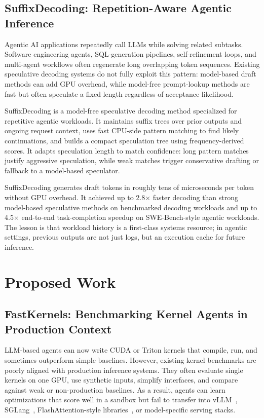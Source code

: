 \documentclass[11pt]{article}
\newcommand{\SuffixDecoding}{SuffixDecoding}
\newcommand{\FastKernels}{FastKernels}
\begin{document}
\subsection{\SuffixDecoding: Repetition-Aware Agentic Inference}

Agentic AI applications repeatedly call LLMs while solving related subtasks. Software engineering agents, SQL-generation pipelines, self-refinement loops, and multi-agent workflows often regenerate long overlapping token sequences. Existing speculative decoding systems do not fully exploit this pattern: model-based draft methods can add GPU overhead, while model-free prompt-lookup methods are fast but often speculate a fixed length regardless of acceptance likelihood.

\SuffixDecoding{} is a model-free speculative decoding method specialized for repetitive agentic workloads. It maintains suffix trees over prior outputs and ongoing request context, uses fast CPU-side pattern matching to find likely continuations, and builds a compact speculation tree using frequency-derived scores. It adapts speculation length to match confidence: long pattern matches justify aggressive speculation, while weak matches trigger conservative drafting or fallback to a model-based speculator.

\SuffixDecoding{} generates draft tokens in roughly tens of microseconds per token without GPU overhead. It achieved up to 2.8$\times$ faster decoding than strong model-based speculative methods on benchmarked decoding workloads and up to 4.5$\times$ end-to-end task-completion speedup on SWE-Bench-style agentic workloads. The lesson is that workload history is a first-class systems resource; in agentic settings, previous outputs are not just logs, but an execution cache for future inference.

\section{Proposed Work}

\subsection{\FastKernels: Benchmarking Kernel Agents in Production Context}

LLM-based agents can now write CUDA or Triton kernels that compile, run, and sometimes outperform simple baselines. However, existing kernel benchmarks are poorly aligned with production inference systems. They often evaluate single kernels on one GPU, use synthetic inputs, simplify interfaces, and compare against weak or non-production baselines. As a result, agents can learn optimizations that score well in a sandbox but fail to transfer into vLLM~\cite{vllm}, SGLang~\cite{sglang}, FlashAttention-style libraries~\cite{flashattention}, or model-specific serving stacks.
\end{document}
